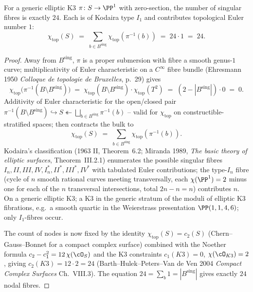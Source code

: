 \begin{proposition}[Kodaira's $\chi=24$ identity on generic elliptic K3]
\label{gluing:prop:kodaira-24}
For a generic elliptic K3 $\pi\colon S \to \PP^1$ with zero-section,
the number of singular fibres is exactly $24$. Each is of Kodaira type
$I_1$ and contributes topological Euler number $1$:
\[
 \chi_{\mathrm{top}}(S) \;=\; \sum_{b \in B^{\mathrm{sing}}}
 \chi_{\mathrm{top}}(\pi^{-1}(b)) \;=\; 24 \cdot 1 \;=\; 24.
\]
\end{proposition}

\begin{proof}
Away from $B^{\mathrm{sing}}$, $\pi$ is a proper submersion with
fibre a smooth genus-$1$ curve; multiplicativity of Euler
characteristic on a $C^\infty$ fibre bundle
(Ehresmann 1950 \emph{Colloque de topologie de Bruxelles}, p.\ 29)
gives
\[
 \chi_{\mathrm{top}}\!\bigl(\pi^{-1}(B \setminus B^{\mathrm{sing}})\bigr)
 \;=\; \chi_{\mathrm{top}}(B \setminus B^{\mathrm{sing}}) \cdot
 \chi_{\mathrm{top}}(T^2) \;=\; (2 - |B^{\mathrm{sing}}|) \cdot 0 \;=\; 0.
\]
Additivity of Euler characteristic for the open/closed pair
$\pi^{-1}(B \setminus B^{\mathrm{sing}}) \hookrightarrow S
\twoheadleftarrow \bigsqcup_{b \in B^{\mathrm{sing}}} \pi^{-1}(b)$
-- valid for $\chi_{\mathrm{top}}$ on constructible-stratified
spaces; then contracts the bulk to
\[
 \chi_{\mathrm{top}}(S) \;=\;
 \sum_{b \in B^{\mathrm{sing}}} \chi_{\mathrm{top}}(\pi^{-1}(b)).
\]
Kodaira's classification (1963 II, Theorem~6.2; Miranda 1989,
\emph{The basic theory of elliptic surfaces}, Theorem~III.2.1)
enumerates the possible singular fibres $I_n, II, III, IV, I_n^*,
II^*, III^*, IV^*$ with tabulated Euler contributions; the
type-$I_n$ fibre (cycle of $n$ smooth rational curves meeting
transversally, each $\chi(\PP^1) = 2$ minus one for each of the $n$
transversal intersections, total $2n - n = n$) contributes $n$.
On a generic elliptic K3; a K3 in the generic stratum of the
moduli of elliptic K3 fibrations, e.g.\ a smooth quartic in the
Weierstrass presentation $\PP(1, 1, 4, 6)$; only $I_1$-fibres
occur.

The count of nodes is now fixed by the identity
$\chi_{\mathrm{top}}(S) = c_2(S)$ (Chern--Gauss--Bonnet for a compact
complex surface) combined with the Noether formula
$c_2 - c_1^2 = 12\, \chi(\cO_S)$ and the K3 constraints
$c_1(K3) = 0$, $\chi(\cO_{K3}) = 2$, giving
$c_2(K3) = 12 \cdot 2 = 24$ (Barth--Hulek--Peters--Van de Ven 2004
\emph{Compact Complex Surfaces} Ch.~VIII.3). The equation
$24 = \sum_b 1 = |B^{\mathrm{sing}}|$ gives exactly $24$ nodal fibres.
\end{proof}

